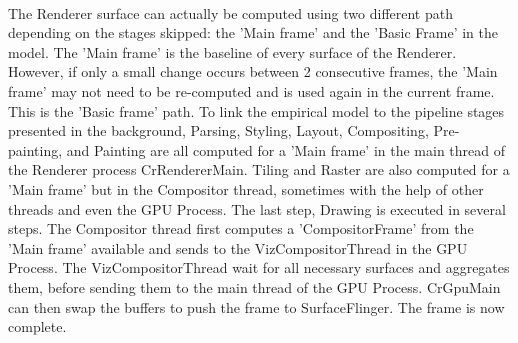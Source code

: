 \documentclass{kththesis}
\begin{document}
\paragraph{}
The Renderer surface can actually be computed using two different path depending on the stages skipped: the 'Main frame' and the 'Basic Frame' in the model. The 'Main frame' is the baseline of every surface of the Renderer. However, if only a small change occurs between 2 consecutive frames, the 'Main frame' may not need to be re-computed and is used again in the current frame. This is the 'Basic frame' path. \newline
To link the empirical model to the pipeline stages presented in the background, Parsing, Styling, Layout, Compositing, Pre-painting, and Painting are all computed for a 'Main frame' in the main thread of the Renderer process CrRendererMain. Tiling and Raster are also computed for a 'Main frame' but in the Compositor thread, sometimes with the help of other threads and even the GPU Process. The last step, Drawing is executed in several steps. The Compositor thread first computes a 'CompositorFrame' from the 'Main frame' available and sends to the VizCompositorThread in the GPU Process. The VizCompositorThread wait for all necessary surfaces and aggregates them, before sending them to the main thread of the GPU Process. CrGpuMain can then swap the buffers to push the frame to SurfaceFlinger. The frame is now complete.
\end{document}
